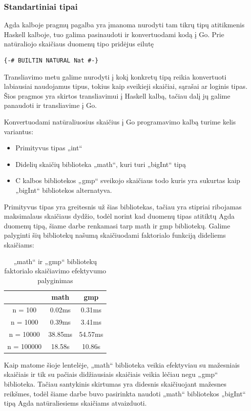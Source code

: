 \documentclass{VUMIFPSkursinis}
\begin{document}
\subsubsection{Standartiniai tipai}
Agda kalboje pragmų pagalba yra įmanoma nurodyti tam tikrų tipų atitikmenis Haskell kalboje, tuo galima pasinaudoti ir konvertuodami kodą į Go. Prie natūraliojo skaičiaus duomenų tipo pridėjus eilutę 
\begin{lstlisting}
{-# BUILTIN NATURAL Nat #-}
\end{lstlisting}
Transliavimo metu galime nurodyti į kokį konkretų tipą reikia konvertuoti labiausiai naudojamus tipus, tokius kaip sveikieji skaičiai, sąrašai ar loginis tipas. Šios pragmos yra skirtos transliavimui į Haskell kalbą, tačiau dalį jų galime panaudoti ir transliavime į Go. \par Konvertuodami natūraliuosius skaičius į Go programavimo kalbą turime kelis variantus:
\begin{itemize}
	\item Primityvus tipas „int“
	\item Didelių skaičių biblioteka „math“, kuri turi „bigInt“ tipą
	\item C kalbos bibliotekos „gmp“ sveikojo skaičiaus todo kuris yra sukurtas kaip  „bigInt“ bibliotekos alternatyva.
\end{itemize}
Primityvus tipas yra greitesnis už šias bibliotekas, tačiau yra stipriai ribojamas maksimalaus skaičiaus dydžio, todėl norint kad duomenų tipas atitiktų Agda duomenų tipą, šiame darbe renkamasi tarp math ir gmp bibliotekų. Galime palyginti šių bibliotekų našumą skaičiuodami faktorialo funkciją dideliems skaičiams:
\begin{center}
	\centering
	\begin{table}[H]
		\caption{„math“ ir „gmp“ bibliotekų faktorialo skaičiavimo efektyvumo palyginimas}
		\centering
	\begin{tabular}{ ccc } 
	\toprule
	& \textbf{math} & \textbf{gmp}  \\
	\midrule
	n = 100 & 0.02ms & 0.31ms    \\
	\midrule
	n = 1000 & 0.39ms & 3.41ms  \\
	\midrule
	n = 10000 & 38.85ms & 54.57ms  \\
	\midrule
	n = 100000 & 18.58s & 10.86s  \\
	\bottomrule
	\end{tabular}
	\centering
\end{table}
	\end{center}
	Kaip matome šioje lentelėje, „math“ biblioteka veikia efektyviau su mažesniais skaičiais ir tik su pačiais didžiausiais skaičiais veikia lėčiau negu „gmp“ biblioteka. Tačiau santykinis skirtumas yra didesnis skaičiuojant mažesnes reikšmes, todėl šiame darbe buvo pasirinkta naudoti „math“ bibliotekos „bigInt“ tipą Agda natūraliesiems skaičiams atvaizduoti.
\end{document}
